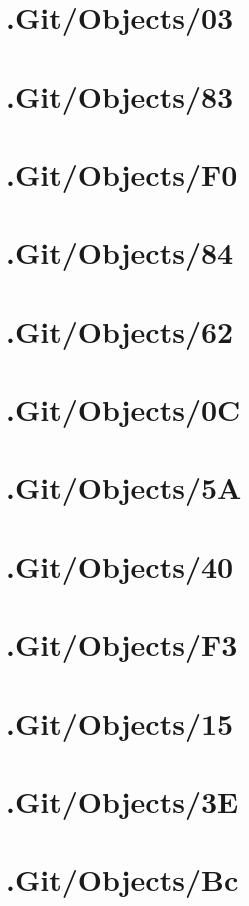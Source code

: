 \section*{.Git/Objects/03}

\section*{.Git/Objects/83}

\section*{.Git/Objects/F0}

\section*{.Git/Objects/84}

\section*{.Git/Objects/62}

\section*{.Git/Objects/0C}

\section*{.Git/Objects/5A}

\section*{.Git/Objects/40}

\section*{.Git/Objects/F3}

\section*{.Git/Objects/15}

\section*{.Git/Objects/3E}

\section*{.Git/Objects/Bc}

